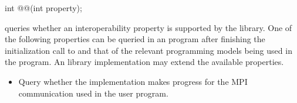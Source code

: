 \begin{apidefinition}

\begin{Csynopsis}
int @@(int property);
\end{Csynopsis}

\begin{apiarguments}
\end{apiarguments}

 queries whether an interoperability property
is supported by the \openshmem library. One of the following properties can be 
queried in an \openshmem program after finishing the
initialization call to \openshmem and that of the relevant programming models
being used in the program. An \openshmem library implementation may extend the
available properties.

\begin{itemize}
\item {} Query whether the \openshmem
implementation makes progress for the MPI communication used in the user program.
\end{itemize}

\end{apidefinition}

